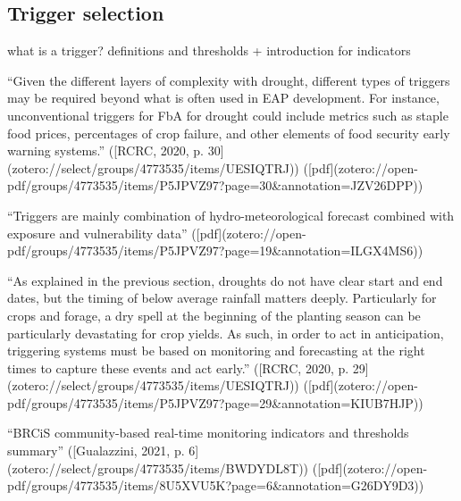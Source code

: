 {%

\subsection{Trigger selection}


what is a trigger? definitions and thresholds + introduction for indicators

“Given the different layers of complexity with drought, different types of triggers may be required beyond what is often used in EAP development. For instance, unconventional triggers for FbA for drought could include metrics such as staple food prices, percentages of crop failure, and other elements of food security early warning systems.” ([RCRC, 2020, p. 30](zotero://select/groups/4773535/items/UESIQTRJ)) ([pdf](zotero://open-pdf/groups/4773535/items/P5JPVZ97?page=30&annotation=JZV26DPP))


“Triggers are mainly combination of hydro-meteorological forecast combined with exposure and vulnerability data” ([pdf](zotero://open-pdf/groups/4773535/items/P5JPVZ97?page=19&annotation=ILGX4MS6))

“As explained in the previous section, droughts do not have clear start and end dates, but the timing of below average rainfall matters deeply. Particularly for crops and forage, a dry spell at the beginning of the planting season can be particularly devastating for crop yields. As such, in order to act in anticipation, triggering systems must be based on monitoring and forecasting at the right times to capture these events and act early.” ([RCRC, 2020, p. 29](zotero://select/groups/4773535/items/UESIQTRJ)) ([pdf](zotero://open-pdf/groups/4773535/items/P5JPVZ97?page=29&annotation=KIUB7HJP))

“BRCiS community-based real-time monitoring indicators and thresholds summary” ([Gualazzini, 2021, p. 6](zotero://select/groups/4773535/items/BWDYDL8T)) ([pdf](zotero://open-pdf/groups/4773535/items/8U5XVU5K?page=6&annotation=G26DY9D3))

}
